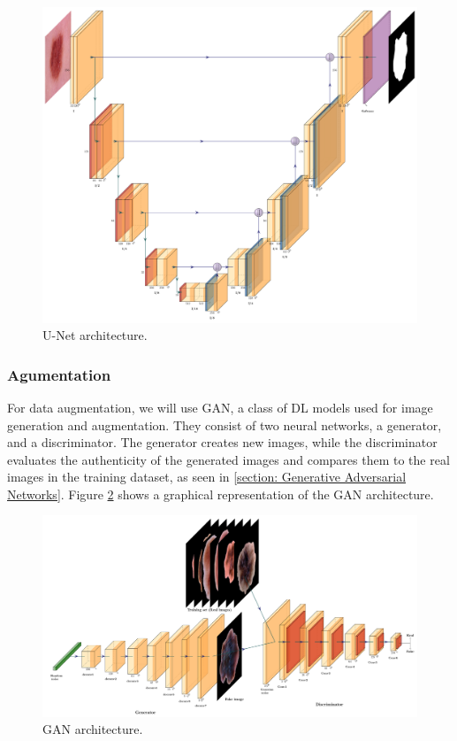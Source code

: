 \documentclass[12pt]{diazessay}
\begin{document}
      \begin{figure}[H]
        \centering
        \includegraphics[width=16cm]{Architectures figures/U-Net.pdf}
        \caption[U-Net architecture]{U-Net architecture.}
        \label{U-Net architecture}
      \end{figure}

    \subsubsection{Agumentation}
    
    \-\hspace{0.7cm}For data augmentation, we will use GAN, a class of DL models used for image generation and augmentation. They consist of two neural networks, a generator, and a discriminator. The generator creates new images, while the discriminator evaluates the authenticity of the generated images and compares them to the real images in the training dataset, as seen in  \ref{section: Generative Adversarial Networks}. Figure \ref{GAN architecture} shows a graphical representation of the GAN architecture.

   \begin{figure}[H]
        \centering
        \includegraphics[width=17cm]{Architectures figures/GAN.pdf}
        \caption[GAN architecture]{GAN architecture.}
        \label{GAN architecture}
    \end{figure}
    
\end{document}
